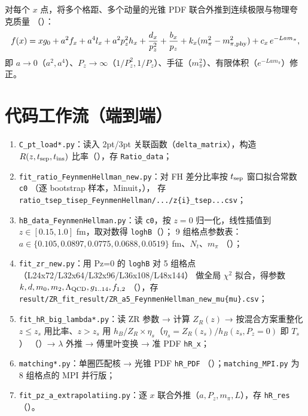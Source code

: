 \documentclass[UTF8]{ctexart}
\begin{document}
对每个 $x$ 点，将多个格距、多个动量的光锥 PDF 联合外推到连续极限与物理夸克质量
（\texttt{}）：
\begin{equation}
  f(x) = xg_0 + a^2 f_x + a^4 l_x + a^2 p_z^2 h_x + \frac{d_x}{p_z^2} + \frac{b_x}{p_z}
       + k_x (m_\pi^2 - m_{\pi,\rm phy}^2) + c_x\, e^{-L a m_\pi},
\end{equation}
即 $a\to0$（$a^2, a^4$）、$P_z\to\infty$（$1/P_z^2, 1/P_z$）、手征（$m_\pi^2$）、有限体积（$e^{-La m_\pi}$）修正。

\section{代码工作流（端到端）}

\begin{enumerate}
  \item \texttt{C\_pt\_load*.py}：读入 2pt/3pt 关联函数（\texttt{delta\_matrix}），构造
        $R(z,t_{\rm sep},t_{\rm ins})$ 比率（\texttt{}），存 \texttt{Ratio\_data}；
  \item \texttt{fit\_ratio\_FeynmenHellman\_new.py}：对 FH 差分比率按 $t_{\rm sep}$ 窗口拟合常数 \texttt{c0}
        （逐 bootstrap 样本，Minuit，\texttt{}），
        存 \texttt{ratio\_tsep\_tisep\_FeynmenHellman/.../z\{i\}\_tsep...csv}；
  \item \texttt{hB\_data\_FeynmenHellman.py}：读 \texttt{c0}，按 $z=0$ 归一化，线性插值到
        $z\in[0.15,1.0]$ fm，取对数得 \texttt{loghB}（\texttt{}）；
        9 组格点参数表：$a \in \{0.105,0.0897,0.0775,0.0688,0.0519\}$ fm、$N_t$、$m_\pi$
        （\texttt{}）；
  \item \texttt{fit\_zr\_new.py}：用 Pz=0 的 \texttt{loghB} 对 5 组格点（L24x72/L32x64/L32x96/L36x108/L48x144）
        做全局 $\chi^2$ 拟合，得参数 $k,d,m_0,m_2,\Lambda_{\rm QCD},g_{1..14},f_{1,2}$
        （\texttt{}），存 \texttt{result/ZR\_fit\_result/ZR\_a5\_FeynmenHellman\_new\_mu\{mu\}.csv}；
  \item \texttt{fit\_hR\_big\_lambda*.py}：读 ZR 参数 → 计算 $Z_R(z)$ → 按混合方案重整化
        $z\le z_s$ 用比率、$z>z_s$ 用 $h_B/Z_R\times\eta_s$（$\eta_s = Z_R(z_s)/h_B(z_s,P_z{=}0)$ 即 $T_s$）
        （\texttt{}）→ $\lambda$ 外推 → 傅里叶变换 → 准 PDF \texttt{hR\_x}；
  \item \texttt{matching*.py}：单圈匹配核 → 光锥 PDF \texttt{hR\_PDF}
        （\texttt{}）；\texttt{matching\_MPI.py} 为 8 组格点的 MPI 并行版；
  \item \texttt{fit\_pz\_a\_extrapolatiing.py}：逐 $x$ 联合外推（$a, P_z, m_\pi, L$），存 \texttt{hR\_res}
        （\texttt{}）。
\end{enumerate}
\end{document}

